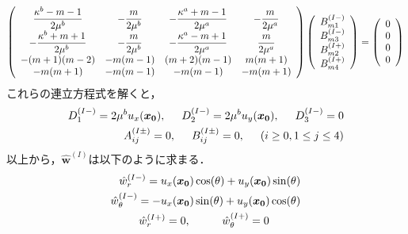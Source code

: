 \begin{align}
	\left(
	\begin{array}{cccc}
		{\displaystyle\frac{ \kappa^b-m-1}{2\mu^{b}}}& {\displaystyle-\frac{m}{2\mu^{b}}} &
		{\displaystyle-\frac{\kappa^a+m-1}{2\mu^{a}}} & {\displaystyle-\frac{m}{2\mu^{a}}} \\
		{\displaystyle-\frac{\kappa^b+m+1}{2\mu^{b}}} & {\displaystyle-\frac{m}{2\mu^{b}}} &
		{\displaystyle-\frac{\kappa^a-m+1}{2\mu^{a}}} & {\displaystyle \frac{m}{2\mu^{a}}} \\
		-(m+1)(m-2) & -m(m-1) & (m+2)(m-1) & m(m+1) \\
		-m(m+1) & -m(m-1) & -m(m-1) & -m(m+1)\\
	\end{array}
	\right)
	\left(
	\begin{array}{c}
		B_{m1}^{(I-)} \\
	 	B_{m3}^{(I-)} \\
		B_{m2}^{(I+)}\\
	 	B_{m4}^{(I+)} \\
	\end{array}
	\right)
	=
	\left(
	\begin{array}{c}
		0 \\
	 	0 \\
		0 \\
	 	0 \\
	\end{array}
	\right)
\end{align}
これらの連立方程式を解くと，
\begin{align}
	D_{1}^{(I-)}=2\mu^{b}u_{x}(\bm{x_{0}}),\hspace{0.5cm}
	D_{2}^{(I-)}=2\mu^{b}u_{y}(\bm{x_{0}}),\hspace{0.5cm}D_{3}^{(I-)}=0
	\nonumber
	\\
	A_{ij}^{(I\pm)}=0,\hspace{0.5cm}
	B_{ij}^{(I\pm)}=0,\hspace{0.5cm}(i\geq0,1\leq j\leq4)
\end{align}
以上から，$\hat{\bm{w}}^{(I)}$は以下のように求まる．
\begin{align}
	\hat{w}_{r}^{(I-)}=u_{x}(\bm{x_{0}})\cos(\theta)+u_{y}(\bm{x_{0}})\sin(\theta)
	\nonumber
	\\
	\hat{w}_{\theta}^{(I-)}=-u_{x}(\bm{x_{0}})\sin(\theta)+u_{y}(\bm{x_{0}})\cos(\theta)
	\nonumber
	\\
	\hat{w}_{r}^{(I+)}=0,\hspace{1.0cm}\hat{w}_{\theta}^{(I+)}=0\hspace{1.0cm}
\end{align}

\newpage
